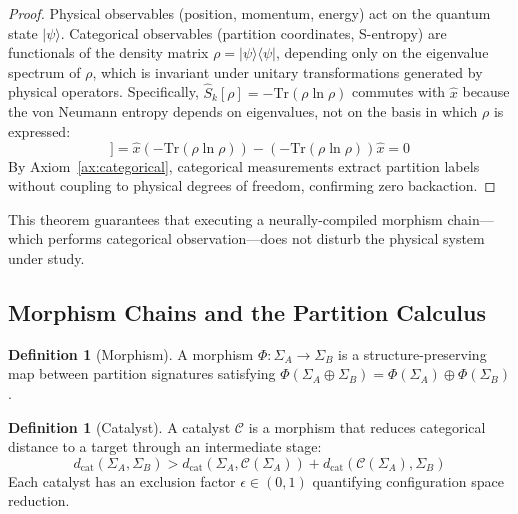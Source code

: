 \documentclass[11pt,a4paper]{article}
\theoremstyle{definition}
\newtheorem{definition}[theorem]{Definition}
\theoremstyle{remark}
\newcommand{\dcat}{d_{\mathrm{cat}}}
\newcommand{\Sig}{\Sigma}
\newcommand{\morphism}{\Phi}
\newcommand{\catalyst}{\mathcal{C}}
\begin{document}
\begin{proof}
Physical observables (position, momentum, energy) act on the quantum state $|\psi\rangle$. Categorical observables (partition coordinates, S-entropy) are functionals of the density matrix $\rho = |\psi\rangle\langle\psi|$, depending only on the eigenvalue spectrum of $\rho$, which is invariant under unitary transformations generated by physical operators. Specifically, $\hat{S}_k[\rho] = -\mathrm{Tr}(\rho \ln \rho)$ commutes with $\hat{x}$ because the von Neumann entropy depends on eigenvalues, not on the basis in which $\rho$ is expressed:
\begin{equation}
[\hat{x}, \hat{S}_k[\rho]] = \hat{x}(-\mathrm{Tr}(\rho \ln \rho)) - (-\mathrm{Tr}(\rho \ln \rho))\hat{x} = 0
\end{equation}
By Axiom~\ref{ax:categorical}, categorical measurements extract partition labels without coupling to physical degrees of freedom, confirming zero backaction.
\end{proof}

This theorem guarantees that executing a neurally-compiled morphism chain---which performs categorical observation---does not disturb the physical system under study.

\subsection{Morphism Chains and the Partition Calculus}

\begin{definition}[Morphism]
A morphism $\morphism: \Sig_A \to \Sig_B$ is a structure-preserving map between partition signatures satisfying $\morphism(\Sig_A \oplus \Sig_B) = \morphism(\Sig_A) \oplus \morphism(\Sig_B)$.
\end{definition}

\begin{definition}[Catalyst]
A catalyst $\catalyst$ is a morphism that reduces categorical distance to a target through an intermediate stage:
\begin{equation}
\dcat(\Sig_A, \Sig_B) > \dcat(\Sig_A, \catalyst(\Sig_A)) + \dcat(\catalyst(\Sig_A), \Sig_B)
\end{equation}
Each catalyst has an exclusion factor $\epsilon \in (0,1)$ quantifying configuration space reduction.
\end{definition}
\end{document}
